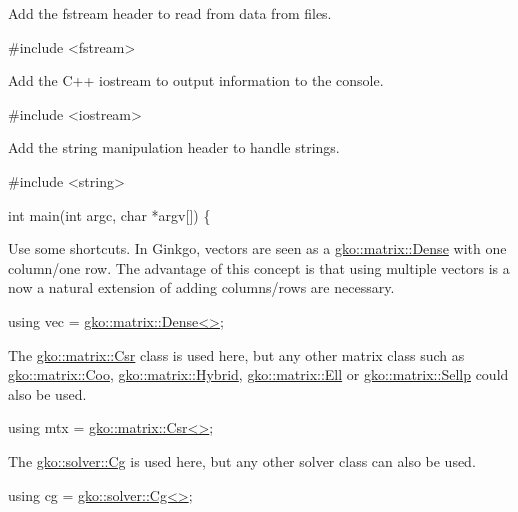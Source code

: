 Add the fstream header to read from data from files.


\begin{DoxyCode}
\textcolor{preprocessor}{#include <fstream>}
\end{DoxyCode}


Add the C++ iostream to output information to the console.


\begin{DoxyCode}
\textcolor{preprocessor}{#include <iostream>}
\end{DoxyCode}


Add the string manipulation header to handle strings.


\begin{DoxyCode}
\textcolor{preprocessor}{#include <string>}


\textcolor{keywordtype}{int} main(\textcolor{keywordtype}{int} argc, \textcolor{keywordtype}{char} *argv[])
\{
\end{DoxyCode}


Use some shortcuts. In Ginkgo, vectors are seen as a \hyperlink{classgko_1_1matrix_1_1Dense}{gko\+::matrix\+::\+Dense} with one column/one row. The advantage of this concept is that using multiple vectors is a now a natural extension of adding columns/rows are necessary.


\begin{DoxyCode}
\textcolor{keyword}{using} vec = \hyperlink{classgko_1_1matrix_1_1Dense}{gko::matrix::Dense<>};
\end{DoxyCode}


The \hyperlink{classgko_1_1matrix_1_1Csr}{gko\+::matrix\+::\+Csr} class is used here, but any other matrix class such as \hyperlink{classgko_1_1matrix_1_1Coo}{gko\+::matrix\+::\+Coo}, \hyperlink{classgko_1_1matrix_1_1Hybrid}{gko\+::matrix\+::\+Hybrid}, \hyperlink{classgko_1_1matrix_1_1Ell}{gko\+::matrix\+::\+Ell} or \hyperlink{classgko_1_1matrix_1_1Sellp}{gko\+::matrix\+::\+Sellp} could also be used.


\begin{DoxyCode}
\textcolor{keyword}{using} mtx = \hyperlink{classgko_1_1matrix_1_1Csr}{gko::matrix::Csr<>};
\end{DoxyCode}


The \hyperlink{classgko_1_1solver_1_1Cg}{gko\+::solver\+::\+Cg} is used here, but any other solver class can also be used.


\begin{DoxyCode}
\textcolor{keyword}{using} cg = \hyperlink{classgko_1_1solver_1_1Cg}{gko::solver::Cg<>};
\end{DoxyCode}


